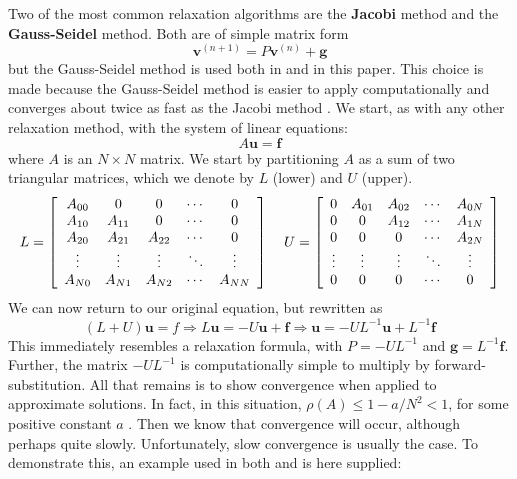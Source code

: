 Two of the most common relaxation algorithms are the \textbf{Jacobi} method and the \textbf{Gauss-Seidel} method. Both are of simple matrix form \[\textbf{v}^{(n+1)}=P\textbf{v}^{(n)}+\textbf{g}\] but the Gauss-Seidel method is used both in \cite{lee14} and in this paper. This choice is made because the Gauss-Seidel method is easier to apply computationally \cite{briggs87} and converges about twice as fast as the Jacobi method \cite{lee14}. We start, as with any other relaxation method, with the system of linear equations:
\[A\textbf{u}=\textbf{f}\]
where $A$ is an $N\times N$ matrix. We start by partitioning $A$ as a sum of two triangular matrices, which we denote by $L$ (lower) and $U$ (upper).
\[L=
\left[\begin{array}{ccccc}
A_{00} & 0 & 0 & \cdots & 0 \\
A_{10} & A_{11} & 0 & \cdots & 0 \\
A_{20} & A_{21} & A_{22} & \cdots & 0 \\
\vdots & \vdots & \vdots & \ddots & \vdots \\
A_{N0} & A_{N1} & A_{N2} & \cdots & A_{NN}
\end{array}\right]
\hspace{.15in}
U=
\left[\begin{array}{ccccc}
0 & A_{01} & A_{02} & \cdots & A_{0N} \\
0 & 0 & A_{12} & \cdots & A_{1N} \\
0 & 0 & 0 & \cdots & A_{2N} \\
\vdots & \vdots & \vdots & \ddots & \vdots \\
0 & 0 & 0 & \cdots & 0
\end{array}\right]\]
We can now return to our original equation, but rewritten as
\[(L+U)\textbf{u}=f\Rightarrow
L\textbf{u}=-U\textbf{u}+\textbf{f}\Rightarrow
\textbf{u}=-UL^{-1}\textbf{u}+L^{-1}\textbf{f}\]
This immediately resembles a relaxation formula, with $P=-UL^{-1}$ and $\textbf{g}=L^{-1}\textbf{f}$. Further, the matrix $-UL^{-1}$ is computationally simple to multiply by forward-substitution. All that remains is to show convergence when applied to approximate solutions. In fact, in this situation, $\rho(A)\leq 1-a/N^2<1$, for some positive constant $a$ \cite{lee14}. Then we know that convergence will occur, although perhaps quite slowly. Unfortunately, slow convergence is usually the case. To demonstrate this, an example used in both \cite{lee14} and \cite{briggs87} is here supplied:
